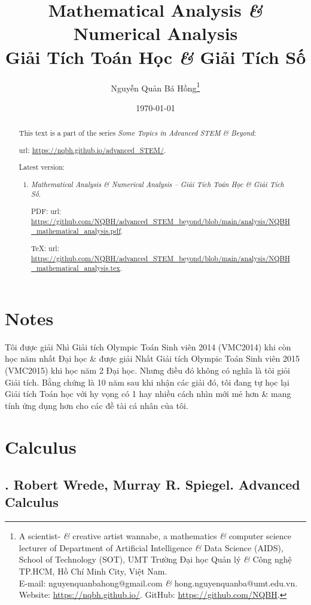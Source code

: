 \documentclass{article}
\title{Mathematical Analysis {\it\&} Numerical Analysis\\Giải Tích Toán Học {\it\&} Giải Tích Số}
\author{Nguyễn Quản Bá Hồng\footnote{A scientist- {\it\&} creative artist wannabe, a mathematics {\it\&} computer science lecturer of Department of Artificial Intelligence {\it\&} Data Science (AIDS), School of Technology (SOT), UMT Trường Đại học Quản lý {\it\&} Công nghệ TP.HCM, Hồ Chí Minh City, Việt Nam.\\E-mail: {\sf nguyenquanbahong@gmail.com} {\it\&} {\sf hong.nguyenquanba@umt.edu.vn}. Website: \url{https://nqbh.github.io/}. GitHub: \url{https://github.com/NQBH}.}}
\date{\today}
\begin{document}
\maketitle
\begin{abstract}
	This text is a part of the series {\it Some Topics in Advanced STEM \& Beyond}:
	
	{\sc url}: \url{https://nqbh.github.io/advanced_STEM/}.
	
	Latest version:
	\begin{enumerate}
		\item {\it Mathematical Analysis \& Numerical Analysis -- Giải Tích Toán Học \& Giải Tích Số}.
		
		PDF: {\sc url}: \url{https://github.com/NQBH/advanced_STEM_beyond/blob/main/analysis/NQBH_mathematical_analysis.pdf}.
		
		\TeX: {\sc url}: \url{https://github.com/NQBH/advanced_STEM_beyond/blob/main/analysis/NQBH_mathematical_analysis.tex}.
	\end{enumerate}
\end{abstract}
\tableofcontents


\section*{Notes}
Tôi được giải Nhì Giải tích Olympic Toán Sinh viên 2014 (VMC2014) khi còn học năm nhất Đại học \& được giải Nhất Giải tích Olympic Toán Sinh viên 2015 (VMC2015) khi học năm 2 Đại học. Nhưng điều đó không có nghĩa là tôi giỏi Giải tích. Bằng chứng là 10 năm sau khi nhận các giải đó, tôi đang tự học lại Giải tích Toán học với hy vọng có 1 hay nhiều cách nhìn mới mẻ hơn \& mang tính ứng dụng hơn cho các đề tài cá nhân của tôi.


\section{Calculus}

\subsection{\cite{Wrede_Spiegel2010}. {\sc Robert Wrede, Murray R. Spiegel}. Advanced Calculus}
{}
\end{document}
